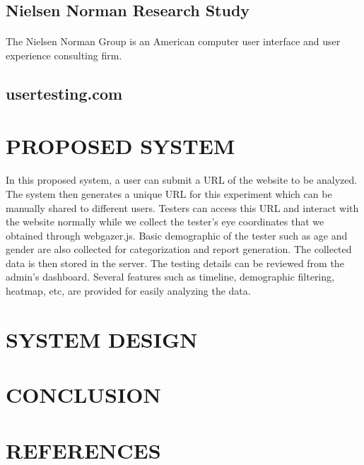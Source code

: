 \documentclass[a4paper,12pt,oneside]{article}
\begin{document}
\subsection{Nielsen Norman Research Study}
\paragraph{}
The Nielsen Norman Group is an American computer user  interface and user experience consulting firm.
\subsection{usertesting.com}

\newpage
\section{PROPOSED SYSTEM}
\paragraph{}
In this proposed system, a user can submit a URL of the website to be analyzed. The system then generates a unique URL for this experiment which can be manually shared to different users.
Testers can access this URL and interact with the website normally while we collect the tester's eye coordinates that we obtained through webgazer.js. Basic demographic of the tester such as age and gender are also collected for categorization and report generation. The collected data is then stored in the server. 
The testing details can be reviewed from the admin's dashboard. Several features such as timeline, demographic filtering, heatmap, etc, are provided for easily analyzing the data.


\newpage
\section{SYSTEM DESIGN}




\newpage
\section{CONCLUSION}
\paragraph{}


\newpage

\section{REFERENCES}
\begin{thebibliography}{9}



\end{thebibliography}
\end{document}
